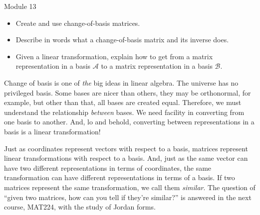 \begin{lesson}

	Module 13

	\begin{itemize}
		\item Create and use change-of-basis matrices.
		\item Describe in words what a change-of-basis matrix and its inverse does.
		\item Given a linear transformation, explain how to get from a matrix representation in a basis $\mathcal A$
			to a matrix representation in a basis $\mathcal B$.
	\end{itemize}

	Change of basis is one of \emph{the} big ideas in linear algebra. The universe has no
	privileged basis. Some bases are nicer than others, they may be orthonormal, for example, but
	other than that, all bases are created equal. Therefore, we must understand the relationship
	\emph{between} bases. We need facility in converting from one basis to another. And, lo and behold,
	converting between representations in a basis is a linear transformation!

	Just as coordinates represent vectors with respect to a basis, matrices represent
	linear transformations with respect to a basis. And, just as the same vector can
	have two different representations in terms of coordinates, the same transformation
	can have different representations in terms of a basis. If two matrices represent the
	same transformation, we call them \emph{similar}. The question of ``given two
	matrices, how can you tell if they're similar?'' is answered in the next course, MAT224, with
	the study of Jordan forms.

\end{lesson}
	\bookonlynewpage
	\question\label{ProbBasisChangeMatrix}
